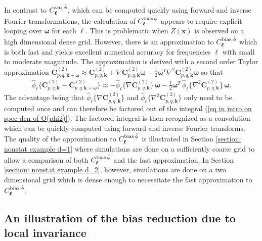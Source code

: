 \documentclass[10pt,noinfoline]{imsart}
\newcommand{\bs}{\boldsymbol}
\begin{document}
In contrast to  $C^{\text{var\,} \hat\phi}_{\bs \ell}$, which can be computed quickly using forward and inverse Fourier transformations, the calculation of $C^{\text{bias\,} \hat\phi}_{\bs \ell}$ appears to require explicit looping over $\bs\omega$ for each $\bs \ell$. This is problematic when $Z(\bs x)$ is observed on a high dimensional dense grid. However, there is an approximation to $C^{\text{bias\,} \hat\phi}_{\bs \ell}$ which is both fast and yields excellent numerical accuracy for frequencies $\bs \ell$ with small to moderate magnitude. The approximation is derived with a second order Taylor approximation $\bs C^{(2)}_{p,q,\bs k + \bs\omega}\approx \bs C^{(2)}_{p,q,\bs k} +  \nabla\bs C^{(2)}_{p,q,\bs k}\bs \omega +  \frac{1}{2}\bs \omega^T \nabla^2\bs C^{(2)}_{p,q,\bs k} \bs \omega$ so that 
\begin{align}
 \hat\phi_{\bs \ell}\big\{{\bs C^{(2)}_{p,q,\bs k}}- {\bs C^{(2)}_{p,q,\bs k + \bs\omega}}\big\}
 \approx 
 -  \hat\phi_{\bs \ell}\big\{ \nabla\bs C^{(2)}_{p,q,\bs k} \big\} \,\bs \omega
 - \textstyle\frac{1}{2}\bs \omega^T\, \hat\phi_{\bs \ell}\big\{ \nabla^2\bs C^{(2)}_{p,q,\bs k} \big\}\,\bs \omega.
 \label{eq: fast approximation to Cpbias}
\end{align}
The advantage being that $ \hat\phi_{\bs \ell}\big\{ \nabla\bs C^{(2)}_{p,q,\bs k} \big\}$ and $\hat\phi_{\bs \ell}\big\{ \nabla^2\bs C^{(2)}_{p,q,\bs k} \big\}$ only need to be computed once and can therefore be factored out of the integral (\ref{eq in intro on spec den of O(phi2)}). The factored integral is then recognized as a convolution which can be quickly computed using forward and inverse Fourier transforms. 
The quality of the approximation to  $C^{\text{bias\,} \hat\phi}_{\bs \ell}$ is illustrated in Section \ref{section: nonstat example d=1} where simulations are done on a sufficiently coarse grid to allow a comparison of both $C^{\text{bias\,} \hat\phi}_{\bs \ell}$ and the fast approximation. In Section \ref{section: nonstat example d=2}, however, simulations are done on a two dimensional grid which is dense enough to necessitate the fast approximation to $C^{\text{bias\,} \hat\phi}_{\bs \ell}$.




%
%
\subsection{An illustration of the bias reduction due to local invariance}
\label{subsubsection: illustration of the bias reduction}
\end{document}
